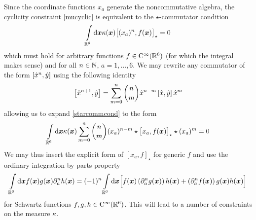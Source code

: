 Since the coordinate functions $x_a$ generate the noncommutative algebra, the
cyclicity constraint \eqref{mucyclic} is equivalent to the $\star$-commutator
condition
\begin{equation}
  \label{starcommcond}
  \int\limits_{{\mathbb R}^6} {\rm d}{\boldsymbol {x} } \kappa({\boldsymbol {x} }) \bigl[(x_a)^n , f({\boldsymbol {x} })
  \bigr]_\star=0
\end{equation}
which must hold for arbitrary functions $f\in{\rm C}^\infty({\mathbb R}^6)$ (for which the
integral makes sense) and for all $n\in{\mathbb N}$, $a=1,\dots,6$. We may rewrite any
commutator of the form $\left[\hat x^n,\hat y\right]$ using the following identity
\begin{equation}
  \label{eq:nw:int:samstheory}
  \left[\hat x^{n+1},\hat y\right] = \sum_{m=0}^n\binom nm
  \hat x^{n-m}\left[\hat x,\hat y\right]\hat x^m
\end{equation}
allowing us to expand \eqref{starcommcond} to the form
\begin{equation}
  \label{commcondexp}
  \int\limits_{{\mathbb R}^6} {\rm d}{\boldsymbol {x} } \kappa({\boldsymbol {x} }) \sum_{m=0}^n {\binom nm}
  (x_a)^{n-m}\star\bigl[x_a , f({\boldsymbol {x} })\bigr]_\star\star (x_a)^m=0
\end{equation}
We may thus insert the explicit form of $[x_a,f]_\star$ for generic $f$ and use
the ordinary integration by parts property
\begin{equation}
  \label{intpartsfgh}
  \int\limits_{{\mathbb R}^6} {\rm d}{\boldsymbol {x} } f({\boldsymbol {x} }) g({\boldsymbol {x} }) \partial_a^nh({\boldsymbol {x} })=
  (-1)^n \int\limits_{{\mathbb R}^6} {\rm d}{\boldsymbol {x} }
  \Bigl[f({\boldsymbol {x} }) \left(\partial_a^n g({\boldsymbol {x} }) \right)
  h({\boldsymbol {x} })+\left( \partial_a^nf({\boldsymbol {x} })\right) g({\boldsymbol {x} }) h({\boldsymbol {x} })\Bigr]
\end{equation}
for Schwartz functions $f,g,h\in{\rm C}^\infty({\mathbb R}^6)$. This will lead to a number of
constraints on the measure $\kappa$.


